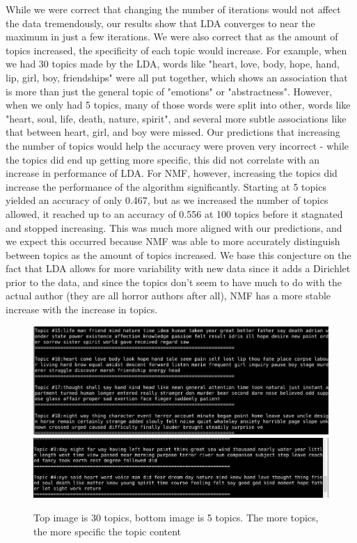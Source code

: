 \documentclass{article}
\begin{document}
While we were correct that changing the number of iterations would not affect the data tremendously, our results show that LDA converges to near the maximum in just a few iterations. We were also correct that as the amount of topics increased, the specificity of each topic would increase. For example, when we had 30 topics made by the LDA, words like "heart, love, body, hope, hand, lip, girl, boy, friendships" were all put together, which shows an association that is more than just the general topic of "emotions" or "abstractness". However, when we only had 5 topics, many of those words were split into other, words like "heart, soul, life, death, nature, spirit", and several more subtle associations like that between heart, girl, and boy were missed. Our predictions that increasing the number of topics would help the accuracy were proven very incorrect - while the topics did end up getting more specific, this did not correlate with an increase in performance of LDA. For NMF, however, increasing the topics did increase the performance of the algorithm significantly. Starting at 5 topics yielded an accuracy of only 0.467, but as we increased the number of topics allowed, it reached up to an accuracy of 0.556 at 100 topics before it stagnated and stopped increasing. This was much more aligned with our predictions, and we expect this occurred because NMF was able to more accurately distinguish between topics as the amount of topics increased. We base this conjecture on the fact that LDA allows for more variability with new data since it adds a Dirichlet prior to the data, and since the topics don't seem to have much to do with the actual author (they are all horror authors after all), NMF has a more stable increase with the increase in topics.

\begin{figure}
    \centering
    \includegraphics[scale =.25]{topics_30.png}
    \\
    \includegraphics[scale =.25]{topics_5.jpg}
    \caption{Top image is 30 topics, bottom image is 5 topics. The more topics, the more specific the topic content}
    \label{fig:topics_specific}
\end{figure}
\end{document}
